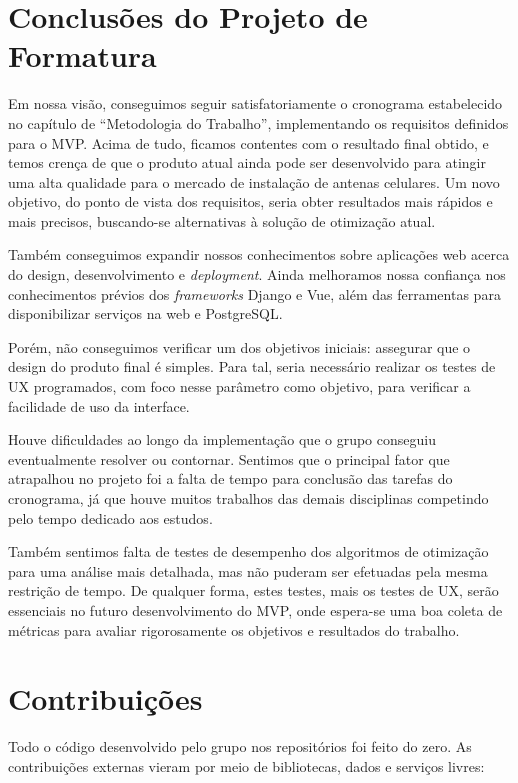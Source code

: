 \documentclass[]{politex}
\begin{document}
\section{Conclusões do Projeto de Formatura}

Em nossa visão, conseguimos seguir satisfatoriamente o cronograma estabelecido
no capítulo de ``Metodologia do Trabalho'', implementando os requisitos
definidos para o MVP. Acima de tudo, ficamos contentes com o resultado final
obtido, e temos crença de que o produto atual ainda pode ser desenvolvido para
atingir uma alta qualidade para o mercado de instalação de antenas celulares. Um
novo objetivo, do ponto de vista dos requisitos, seria obter resultados mais
rápidos e mais precisos, buscando-se alternativas à solução de otimização atual.

Também conseguimos expandir nossos conhecimentos sobre aplicações web acerca do
design, desenvolvimento e \textit{deployment}. Ainda melhoramos nossa confiança
nos conhecimentos prévios dos \textit{frameworks} Django e Vue, além das
ferramentas para disponibilizar serviços na web e PostgreSQL.

Porém, não conseguimos verificar um dos objetivos iniciais: assegurar que
o design do produto final é simples. Para tal, seria necessário realizar os
testes de UX programados, com foco nesse parâmetro como objetivo, para verificar
a facilidade de uso da interface.

Houve dificuldades ao longo da implementação que o grupo conseguiu eventualmente
resolver ou contornar. Sentimos que o principal fator que atrapalhou no projeto
foi a falta de tempo para conclusão das tarefas do cronograma, já que houve
muitos trabalhos das demais disciplinas competindo pelo tempo dedicado aos
estudos.

Também sentimos falta de testes de desempenho dos algoritmos de otimização para
uma análise mais detalhada, mas não puderam ser efetuadas pela mesma restrição
de tempo. De qualquer forma, estes testes, mais os testes de UX, serão
essenciais no futuro desenvolvimento do MVP, onde espera-se uma boa coleta de
métricas para avaliar rigorosamente os objetivos e resultados do trabalho.

\section{Contribuições}

Todo o código desenvolvido pelo grupo nos repositórios foi feito do zero. As
contribuições externas vieram por meio de bibliotecas, dados e serviços livres:
\end{document}
